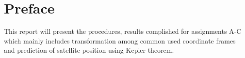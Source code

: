 \chapter{Preface}
This report will present the procedures, results complished for assignments A-C which mainly includes transformation among common used coordinate frames and prediction of satellite position using Kepler theorem.